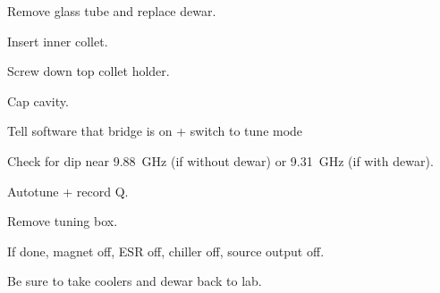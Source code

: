 Remove glass tube and replace dewar.

Insert inner collet.

Screw down top collet holder.

Cap cavity.

Tell software that bridge is on + switch to tune mode

Check for dip near 9.88~GHz (if without dewar) or 9.31~GHz (if with dewar).

Autotune + record Q.

Remove tuning box.

If done, magnet off, ESR off, chiller off, source output off.

Be sure to take coolers and dewar back to lab.

\timeblockend

